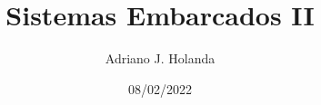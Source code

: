 \documentclass[a4paper]{article}
\title{Sistemas Embarcados II}
\author{Adriano J. Holanda}
\date{}
\begin{document}
\date{08/02/2022}
\maketitle

\end{document}
